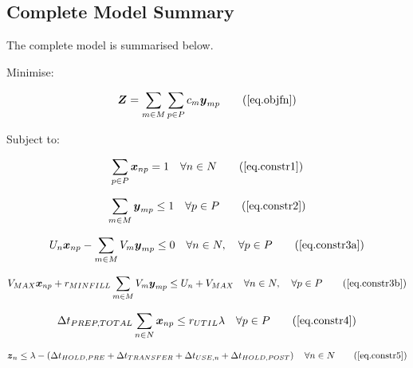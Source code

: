 \subsection{Complete Model Summary}\label{SS.completesummary}

The complete model is summarised below.

Minimise:

\begin{equation}
    \boldsymbol{Z} = \sum_{m \in M} \sum_{p \in P} c_m \boldsymbol{y}_{mp}
    \tag{\ref{eq.objfn}}
\end{equation}

Subject to:

\begin{equation}
    \sum_{p \in P} \boldsymbol{x}_{np} = 1 \quad \forall n \in N
    \tag{\ref{eq.constr1}}
\end{equation}

\begin{equation}
    \sum_{m \in M} \boldsymbol{y}_{mp} \le 1 \quad \forall p \in P
    \tag{\ref{eq.constr2}}
\end{equation}

\begin{equation}
    U_{n} \boldsymbol{x}_{np} - \sum_{m \in M} V_{m} \boldsymbol{y}_{mp} \le 0
    \quad \forall n \in N, \quad \forall p \in P
    \tag{\ref{eq.constr3a}}
\end{equation}

\begin{equation}
    V_{MAX} \boldsymbol{x}_{np} + r_{MINFILL} \sum_{m \in M} V_{m} 
    \boldsymbol{y}_{mp} \le U_{n} + V_{MAX} \quad \forall n \in N, \quad
    \forall p \in P
    \tag{\ref{eq.constr3b}}
\end{equation}

\begin{equation}
    \Delta t_{PREP,TOTAL} \sum_{n \in N} \boldsymbol{x}_{np} \le r_{UTIL} 
    \lambda \quad \forall p \in P
    \tag{\ref{eq.constr4}}
\end{equation}

\begin{equation}
    \boldsymbol{z}_{n} \le \lambda - \left( \Delta t_{HOLD,PRE} +
    \Delta t_{TRANSFER} + \Delta t_{USE,n} + \Delta t_{HOLD,POST} \right)
    \quad \forall n \in N
    \tag{\ref{eq.constr5}}
\end{equation}

